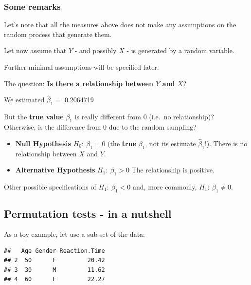 \documentclass[
]{article}
\begin{document}
\hypertarget{some-remarks}{%
\subsubsection{Some remarks}\label{some-remarks}}

Let's note that all the measures above does not make any assumptions on
the random process that generate them.

Let now assume that \(Y\) - and possibly \(X\) - is generated by a
random variable.

Further minimal assumptions will be specified later.

The question: \textbf{Is there a relationship between \(Y\) and \(X\)}?

We estimated \(\hat{\beta}_1=\) 0.2064719

But the \textbf{true value} \(\beta_1\) is really different from 0
(i.e.~no relationship)?\\
Otherwise, is the difference from 0 due to the random sampling?

\begin{itemize}
\item
  \textbf{Null Hypothesis} \(H_0: \ \beta_1=0\) (the \textbf{true}
  \(\beta_1\), not its estimate \(\hat{\beta}_1\)!). There is no
  relationship between \(X\) and \(Y\).
\item
  \textbf{Alternative Hypothesis }\(H_1: \ \beta_1 >0\) The relationship
  is positive.
\end{itemize}

Other possible specifications of \(H_1: \ \beta_1< 0\) and, more
commonly, \(H_1: \ \beta_1 \neq 0\).

\hypertarget{permutation-tests---in-a-nutshell}{%
\subsection{Permutation tests - in a
nutshell}\label{permutation-tests---in-a-nutshell}}

As a toy example, let use a sub-set of the data:

\begin{verbatim}
##   Age Gender Reaction.Time
## 2  50      F         20.42
## 3  30      M         11.62
## 4  60      F         22.27
\end{verbatim}
\end{document}
